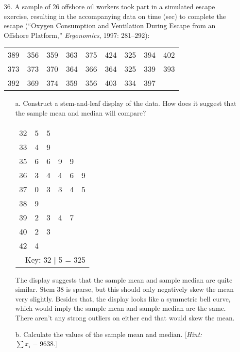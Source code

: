 \documentclass[letterpaper,12pt]{article}
\begin{document}
\begin{enumerate}
\begin{enumerate}
    \end{enumerate}
  \item[36.]
    A sample of 26 offshore oil workers took part in a simulated escape exercise, resulting in the accompanying data on time (sec) to complete the escape (``Oxygen Consumption and Ventilation During Escape from an Offshore Platform,'' \textit{Ergonomics}, 1997: 281–292):
    \begin{center}
      \begin{tabular}{ccccccccc}
        389 & 356 & 359 & 363 & 375 & 424 & 325 & 394 & 402 \\
        373 & 373 & 370 & 364 & 366 & 364 & 325 & 339 & 393 \\
        392 & 369 & 374 & 359 & 356 & 403 & 334 & 397
      \end{tabular}
    \end{center}
    \begin{enumerate}
      \item[a.]
        Construct a stem-and-leaf display of the data. How does it suggest that the sample mean and median will compare?
        \begin{center}
          \begin{tabular}{c|ccccc}
            32 & 5 & 5 \\
            33 & 4 & 9 \\
            35 & 6 & 6 & 9 & 9 \\
            36 & 3 & 4 & 4 & 6 & 9 \\
            37 & 0 & 3 & 3 & 4 & 5 \\
            38 & 9 \\
            39 & 2 & 3 & 4 & 7 \\
            40 & 2 & 3 \\
            42 & 4 \\
            \multicolumn{6}{r}{Key: 32 | 5 = 325}
          \end{tabular}
        \end{center}
        The display suggests that the sample mean and sample median are quite similar. Stem 38 is sparse, but this should only negatively skew the mean very slightly. Besides that, the display looks like a symmetric bell curve, which would imply the sample mean and sample median are the same. There aren't any strong outliers on either end that would skew the mean.
      \item[b.]
        Calculate the values of the sample mean and median. [\textit{Hint:} $\sum{x_i} = 9638$.]
        \begin{align*}

\end{align*}
\end{enumerate}
\end{enumerate}
\end{document}
